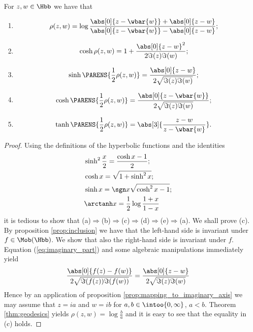 \begin{theorem}
	For $z,w \in \Hbb$ we have that
	\begin{enumerate}[label = \textup{(}\alph*\textup{)}]
		\item 
			\begin{equation}
				\rho(z,w) = \log \frac{\abs[0]{z - \wbar{w}} + \abs[0]{z - w}}{\abs[0]{z - \wbar{w}} - \abs[0]{z - w}};
			\end{equation}
		\item
			\begin{equation}
				\cosh \rho(z,w) = 1 + \frac{\abs[0]{z - w}^2}{2 \Im(z)\Im(w)};
			\end{equation}
		\item
			\begin{equation}
				\sinh \PARENS{\frac{1}{2}\rho(z,w)} = \frac{\abs[0]{z - w}}{2\sqrt{\Im(z)\Im(w)}};
			\end{equation}
		\item
			\begin{equation}
				\cosh \PARENS{\frac{1}{2}\rho(z,w)} = \frac{\abs[0]{z - \wbar{w}}}{2\sqrt{\Im(z)\Im(w)}};
			\end{equation}
		\item
			\begin{equation}
				\tanh \PARENS{\frac{1}{2}\rho(z,w)} = \abs[3]{\frac{z - w}{z - \wbar{w}}}.
			\end{equation}
	\end{enumerate}
	\label{thm:formulas}
\end{theorem}

\begin{proof}
	Using the definitions of the hyperbolic functions and the identities
	\begin{align*}
		& \sinh^2 \frac{x}{2} = \frac{\cosh x - 1}{2};\\
		& \cosh x = \sqrt{1 + \sinh^2 x};\\
		& \sinh x = \sgn x \sqrt{\cosh^2 x - 1};\\
		& \arctanh x = \frac{1}{2} \log \frac{1 + x}{1 - x}
	\end{align*}
	\noindent it is tedious to show that (a)$\Rightarrow$(b)$\Rightarrow$(c)$\Rightarrow$(d)$\Rightarrow$(e)$\Rightarrow$(a). We shall prove (c). By proposition \ref{prop:inclusion} we have that the left-hand side is invariant under $f \in \Mob(\Hbb)$. We show that also the right-hand side is invariant under $f$. Equation (\ref{eq:imaginary_part}) and some algebraic manipulations immediately yield
	\begin{equation*}
		\frac{\abs[0]{f(z) - f(w)}}{2\sqrt{\Im(f(z))\Im(f(w))}} = \frac{\abs[0]{z - w}}{2\sqrt{\Im(z)\Im(w)}}
	\end{equation*}
	Hence by an application of proposition \ref{prop:mapping_to_imaginary_axis} we may assume that $z = ia$ and $w = ib$ for $a,b \in \intoo{0,\infty}$, $a < b$. Theorem \ref{thm:geodesics} yields $\rho(z,w) = \log \frac{b}{a}$ and it is easy to see that the equality in (c) holds.
\end{proof}

